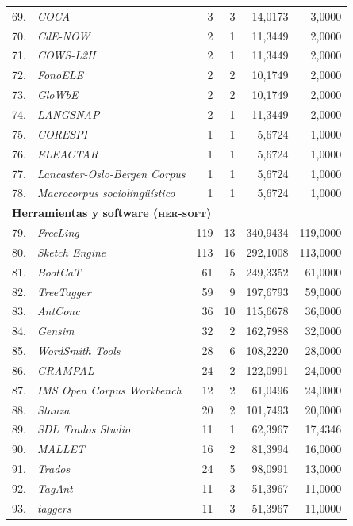 \begin{longtable}{@{} r p{5cm} r r r r @{}}
69. & \textit{COCA} & 3 & 3 & 14{,}0173 & 3{,}0000 \\
70. & \textit{CdE-NOW} & 2 & 1 & 11{,}3449 & 2{,}0000 \\
71. & \textit{COWS-L2H} & 2 & 1 & 11{,}3449 & 2{,}0000 \\
72. & \textit{FonoELE} & 2 & 2 & 10{,}1749 & 2{,}0000 \\
73. & \textit{GloWbE} & 2 & 2 & 10{,}1749 & 2{,}0000 \\
74. & \textit{LANGSNAP} & 2 & 1 & 11{,}3449 & 2{,}0000 \\
75. & \textit{CORESPI} & 1 & 1 & 5{,}6724 & 1{,}0000 \\
76. & \textit{ELEACTAR} & 1 & 1 & 5{,}6724 & 1{,}0000 \\
77. & \textit{Lancaster-Oslo-Bergen Corpus} & 1 & 1 & 5{,}6724 & 1{,}0000 \\
78. & \textit{Macrocorpus sociolingüístico} & 1 & 1 & 5{,}6724 & 1{,}0000 \\
\midrule
\multicolumn{6}{l}{\textbf{Herramientas y software (\textsc{her-soft})}} \\
\midrule
79. & \textit{FreeLing} & 119 & 13 & 340{,}9434 & 119{,}0000 \\
80. & \textit{Sketch Engine} & 113 & 16 & 292{,}1008 & 113{,}0000 \\
81. & \textit{BootCaT} & 61 & 5 & 249{,}3352 & 61{,}0000 \\
82. & \textit{TreeTagger} & 59 & 9 & 197{,}6793 & 59{,}0000 \\
83. & \textit{AntConc} & 36 & 10 & 115{,}6678 & 36{,}0000 \\
84. & \textit{Gensim} & 32 & 2 & 162{,}7988 & 32{,}0000 \\
85. & \textit{WordSmith Tools} & 28 & 6 & 108{,}2220 & 28{,}0000 \\
86. & \textit{GRAMPAL} & 24 & 2 & 122{,}0991 & 24{,}0000 \\
87. & \textit{IMS Open Corpus Workbench} & 12 & 2 & 61{,}0496 & 24{,}0000 \\
88. & \textit{Stanza} & 20 & 2 & 101{,}7493 & 20{,}0000 \\
89. & \textit{SDL Trados Studio} & 11 & 1 & 62{,}3967 & 17{,}4346 \\
90. & \textit{MALLET} & 16 & 2 & 81{,}3994 & 16{,}0000 \\
91. & \textit{Trados} & 24 & 5 & 98{,}0991 & 13{,}0000 \\
92. & \textit{TagAnt} & 11 & 3 & 51{,}3967 & 11{,}0000 \\
93. & \textit{taggers} & 11 & 3 & 51{,}3967 & 11{,}0000 \\

\end{longtable}

